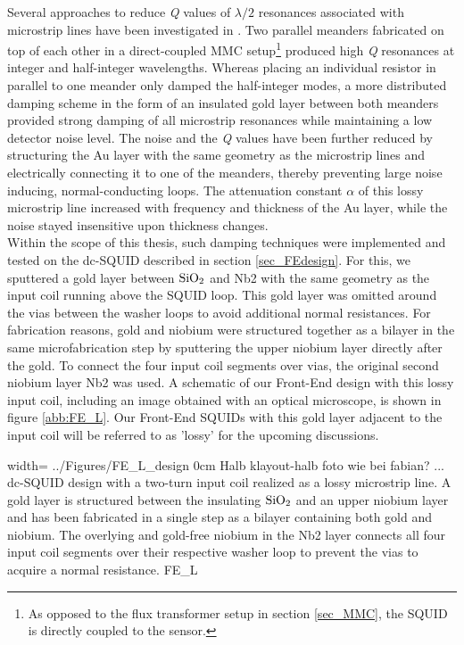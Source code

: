 Several approaches to reduce \textit{Q} values of $\lambda/2$ resonances associated with microstrip lines have been investigated in \cite{Boyd2022}. Two parallel meanders fabricated on top of each other in a direct-coupled MMC setup\footnote{As opposed to the flux transformer setup in section \ref{sec_MMC}, the SQUID is directly coupled to the sensor.} produced high \textit{Q} resonances at integer and half-integer wavelengths. Whereas placing an individual resistor in parallel to one meander only damped the half-integer modes, a more distributed damping scheme in the form of an insulated gold layer between both meanders provided strong damping of all microstrip resonances while maintaining a low detector noise level. The noise and the \textit{Q} values have been further reduced by structuring the Au layer with the same geometry as the microstrip lines and electrically connecting it to one of the meanders, thereby preventing large noise inducing, normal-conducting loops. The attenuation constant $\alpha$ of this lossy microstrip line increased with frequency and thickness of the Au layer, while the noise stayed insensitive upon thickness changes. \\
Within the scope of this thesis, such damping techniques were implemented and tested on the dc-SQUID described in section \ref{sec_FEdesign}. For this, we sputtered a gold layer between $\rm SiO_2$ and Nb2 with the same geometry as the input coil running above the SQUID loop. This gold layer was omitted around the vias between the washer loops to avoid additional normal resistances. For fabrication reasons, gold and niobium were structured together as a bilayer in the same microfabrication step by sputtering the upper niobium layer directly after the gold. To connect the four input coil segments over vias, the original second niobium layer Nb2 was used. A schematic of our Front-End design with this lossy input coil, including an image obtained with an optical microscope, is shown in figure \ref{abb:FE_L}. Our Front-End SQUIDs with this gold layer adjacent to the input coil will be referred to as 'lossy' for the upcoming discussions. 

{width=\textwidth}
{../Figures/FE_L_design}
{0cm}
{Halb klayout-halb foto wie bei fabian? ... dc-SQUID design with a two-turn input coil realized as a lossy microstrip line. A gold layer is structured between the insulating $\rm SiO_2$ and an upper niobium layer and has been fabricated in a single step as a bilayer containing both gold and niobium. The overlying and gold-free niobium in the Nb2 layer connects all four input coil segments over their respective washer loop to prevent the vias to acquire a normal resistance.} 
{FE_L}

